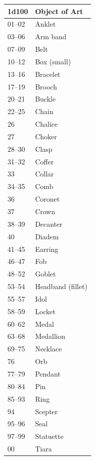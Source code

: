 \begin{multicols}{2}
\noindent
\begin{minipage}{\columnwidth}

\label{jewelry}
\noindent
\begin{tabular}{|p{}|p{}|}
\hline
1d100	& Object of Art \\
\hline\hline
\rowcolor[gray]{.9}01--02	& Anklet \\
03--06	& Arm band \\
\rowcolor[gray]{.9}07--09	& Belt \\
10--12	& Box (small) \\
\rowcolor[gray]{.9}13--16	& Bracelet \\
17--19	& Brooch \\
\rowcolor[gray]{.9}20--21	& Buckle \\
22--25	& Chain \\
\rowcolor[gray]{.9}26	& Chalice \\
27	& Choker \\
\rowcolor[gray]{.9}28--30	& Clasp \\
31--32	& Coffer \\
\rowcolor[gray]{.9}33	& Collar \\
34--35	& Comb \\
\rowcolor[gray]{.9}36	& Coronet \\
37	& Crown \\
\rowcolor[gray]{.9}38--39	& Decanter \\
40	& Diadem \\
\rowcolor[gray]{.9}41--45	& Earring \\
46--47	& Fob \\
\rowcolor[gray]{.9}48--52	& Goblet \\
53--54	& Headband (fillet) \\
\rowcolor[gray]{.9}55--57	& Idol \\
58--59	& Locket \\
\rowcolor[gray]{.9}60--62	& Medal \\
63--68	& Medallion \\
\rowcolor[gray]{.9}69--75	& Necklace \\
76	& Orb \\
\rowcolor[gray]{.9}77--79	& Pendant \\
80--84	& Pin \\
\rowcolor[gray]{.9}85--93	& Ring \\
94	& Scepter \\
\rowcolor[gray]{.9}95--96	& Seal \\
97--99	& Statuette \\
\rowcolor[gray]{.9}00	& Tiara \\
\hline
\end{tabular}


\end{minipage}
\end{multicols}
